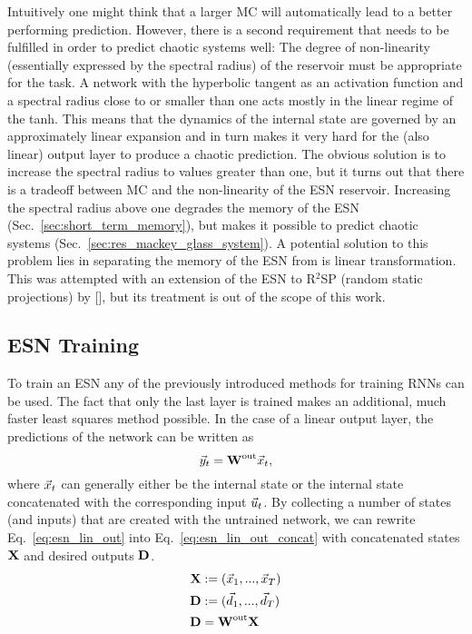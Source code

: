 Intuitively one might think that a larger MC will
automatically lead to a better performing prediction. However, there is a
second requirement that needs to be fulfilled in order to predict chaotic
systems well: The degree of non-linearity (essentially expressed by the
spectral radius) of the reservoir must be appropriate for the task.
A network with the hyperbolic tangent as an activation function and 
a spectral radius close to or smaller than one acts mostly in the
linear regime of the tanh. This means that the dynamics of the internal state
are governed by an approximately linear expansion and in turn makes it very
hard for the (also linear) output layer to produce a chaotic prediction.
The obvious solution is to increase the spectral radius to values greater than
one, but it turns out that there is a tradeoff between MC and the non-linearity
of the ESN reservoir. Increasing the spectral radius above one degrades the
memory of the ESN (Sec.~\ref{sec:short_term_memory}), but makes it possible
to predict chaotic systems (Sec.~\ref{sec:res_mackey_glass_system}).
A potential solution to this problem lies in separating the memory of the ESN
from is linear transformation. This was attempted with an extension of the ESN
to R$^2$SP (random static projections) by [\cite{butcher2013}], but its treatment
is out of the scope of this work.


\subsection{ESN Training}
\label{sub:esn_training}

To train an ESN any of the previously introduced methods for training RNNs can
be used. The fact that only the last layer is trained makes an additional, much
faster least squares method possible.  In the case of a linear output layer,
the predictions of the network can be written as
\begin{equation}
  \vec{y}_t = \boldsymbol{\textbf{W}}^{\text{out}} \vec{x}_t,
  \label{eq:esn_lin_out}
\end{equation}
where $\vec{x}_t$ can generally either be the internal state or the internal state
concatenated with the corresponding input $\vec{u}_t$.  By collecting a number of
states (and inputs) that are created with the untrained network, we can rewrite
Eq.~\ref{eq:esn_lin_out} into Eq.~\ref{eq:esn_lin_out_concat} with concatenated
states $\boldsymbol{\textbf{X}}$ and desired outputs $\boldsymbol{\textbf{D}}$.
\begin{align}
  \boldsymbol{\textbf{X}} &:= (\vec{x}_1, ..., \vec{x}_T) \\
  \boldsymbol{\textbf{D}} &:= (\vec{d}_1, ..., \vec{d}_T) \\
  \boldsymbol{\textbf{D}} &= \boldsymbol{\textbf{W}}^{\text{out}} \boldsymbol{\textbf{X}} \label{eq:esn_lin_out_concat}
\end{align}

